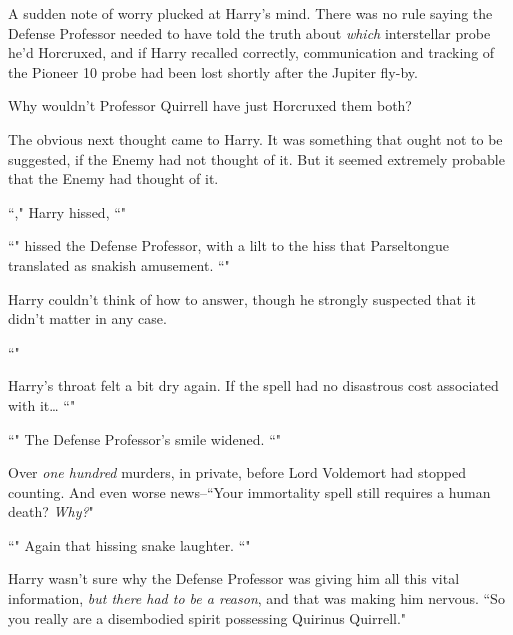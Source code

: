 A sudden note of worry plucked at Harry's mind. There was no rule saying the Defense Professor needed to have told the truth about \emph{which} interstellar probe he'd Horcruxed, and if Harry recalled correctly, communication and tracking of the Pioneer 10 probe had been lost shortly after the Jupiter fly-by.

Why wouldn't Professor Quirrell have just Horcruxed them both?

The obvious next thought came to Harry. It was something that ought not to be suggested, if the Enemy had not thought of it. But it seemed extremely probable that the Enemy had thought of it.

``," Harry hissed, ``"

``" hissed the Defense Professor, with a lilt to the hiss that Parseltongue translated as snakish amusement. ``"

Harry couldn't think of how to answer, though he strongly suspected that it didn't matter in any case.

``"

Harry's throat felt a bit dry again. If the spell had no disastrous cost associated with it{\ldots} ``"

``" The Defense Professor's smile widened. ``"

Over \emph{one hundred} murders, in private, before Lord Voldemort had stopped counting. And even worse news\---``Your immortality spell still requires a human death? \emph{Why?}"

``" Again that hissing snake laughter. ``"

Harry wasn't sure why the Defense Professor was giving him all this vital information, \emph{but there had to be a reason}, and that was making him nervous. ``So you really are a disembodied spirit possessing Quirinus Quirrell."

